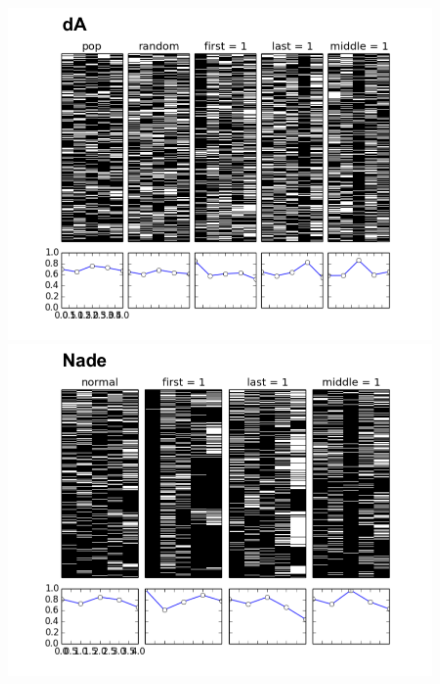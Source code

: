 \documentclass[twoside]{article}
\begin{document}
\begin{figure}[t!]
\centering
    \includegraphics[scale=0.7]{da_croad.pdf}
  \includegraphics[scale=0.7]{nade_croad.pdf}
  \caption{}
\end{figure}
\end{document}
